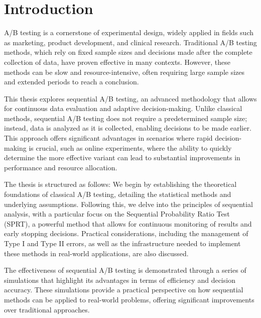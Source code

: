 \documentclass[magisterska, english]{pwr_wmat_praca_dyplomowa}
\theoremstyle{plain}
\numberwithin{theorem}{chapter}
\theoremstyle{definition}
\numberwithin{theorem}{chapter}
\begin{document}
\frontmatter
\maketitle
\mainmatter
\tableofcontents
{\backmatter \chapter{Introduction}} 

A/B testing is a cornerstone of experimental design, widely applied in fields such as marketing, product development, and clinical research. Traditional A/B testing methods, which rely on fixed sample sizes and decisions made after the complete collection of data, have proven effective in many contexts. However, these methods can be slow and resource-intensive, often requiring large sample sizes and extended periods to reach a conclusion.

This thesis explores sequential A/B testing, an advanced methodology that allows for continuous data evaluation and adaptive decision-making. Unlike classical methods, sequential A/B testing does not require a predetermined sample size; instead, data is analyzed as it is collected, enabling decisions to be made earlier. This approach offers significant advantages in scenarios where rapid decision-making is crucial, such as online experiments, where the ability to quickly determine the more effective variant can lead to substantial improvements in performance and resource allocation.

The thesis is structured as follows: We begin by establishing the theoretical foundations of classical A/B testing, detailing the statistical methods and underlying assumptions. Following this, we delve into the principles of sequential analysis, with a particular focus on the Sequential Probability Ratio Test (SPRT), a powerful method that allows for continuous monitoring of results and early stopping decisions. Practical considerations, including the management of Type I and Type II errors, as well as the infrastructure needed to implement these methods in real-world applications, are also discussed.

The effectiveness of sequential A/B testing is demonstrated through a series of simulations that highlight its advantages in terms of efficiency and decision accuracy. These simulations provide a practical perspective on how sequential methods can be applied to real-world problems, offering significant improvements over traditional approaches.
\end{document}
